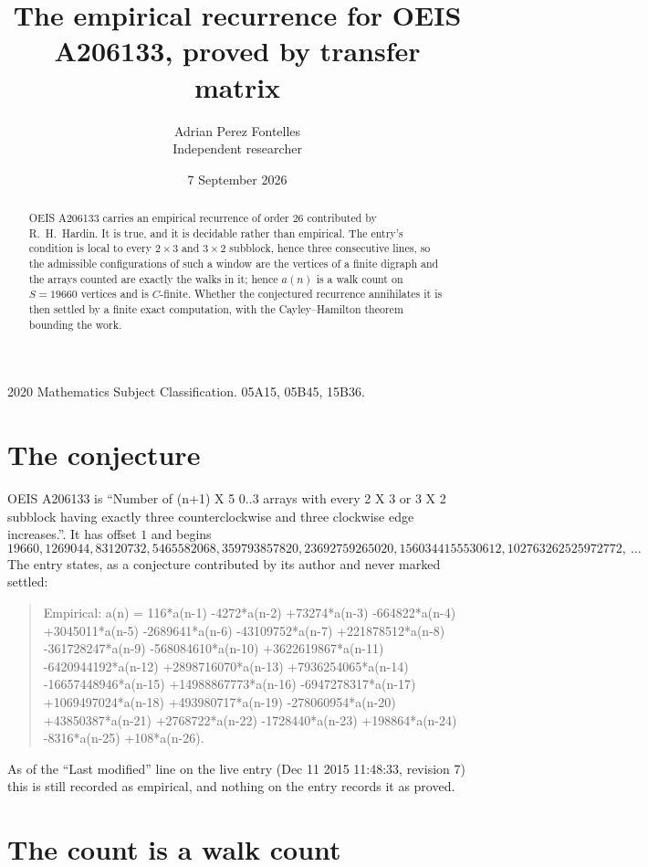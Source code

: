 \documentclass[11pt,a4paper]{article}
\title{The empirical recurrence for OEIS A206133, proved by transfer matrix}
\author{Adrian Perez Fontelles\\ \small Independent researcher}
\date{7 September 2026}
\theoremstyle{plain}
\theoremstyle{definition}
\begin{document}
\maketitle

\begin{abstract}
OEIS A206133 carries an empirical recurrence of order $26$ contributed by R.~H.~Hardin. It is
true, and it is decidable rather than empirical. The entry's condition is local to every $2\times3$ and $3\times2$ subblock, hence three consecutive lines, so
the admissible configurations of such a window are the vertices of a finite digraph and the
arrays counted are exactly the walks in it; hence $a(n)$ is a walk count on $S=19660$ vertices
and is $C$-finite. Whether the conjectured recurrence annihilates it is then settled by a
finite exact computation, with the Cayley--Hamilton theorem bounding the work.
\end{abstract}

\noindent\small 2020 Mathematics Subject Classification. 05A15, 05B45, 15B36.\normalsize

\section{The conjecture}

OEIS A206133 is ``Number of (n+1) X 5 0..3 arrays with every 2 X 3 or 3 X 2 subblock having exactly three counterclockwise and three clockwise edge increases.''. It has offset $1$ and begins
\[
19660, 1269044, 83120732, 5465582068, 359793857820, 23692759265020, 1560344155530612, 102763262525972772,\ \dots
\]
The entry states, as a conjecture contributed by its author and never marked settled:
\begin{quote}
Empirical: a(n) = 116*a(n-1) -4272*a(n-2) +73274*a(n-3) -664822*a(n-4) +3045011*a(n-5) -2689641*a(n-6) -43109752*a(n-7) +221878512*a(n-8) -361728247*a(n-9) -568084610*a(n-10) +3622619867*a(n-11) -6420944192*a(n-12) +2898716070*a(n-13) +7936254065*a(n-14) -16657448946*a(n-15) +14988867773*a(n-16) -6947278317*a(n-17) +1069497024*a(n-18) +493980717*a(n-19) -278060954*a(n-20) +43850387*a(n-21) +2768722*a(n-22) -1728440*a(n-23) +198864*a(n-24) -8316*a(n-25) +108*a(n-26).
\end{quote}
As of the ``Last modified'' line on the live entry (Dec 11 2015 11:48:33, revision 7) this is still
recorded as empirical, and nothing on the entry records it as proved.

\section{The count is a walk count}
\end{document}
